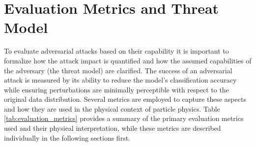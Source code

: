 
\section{Evaluation Metrics and Threat Model}

To evaluate adversarial attacks based on their capability it is important to  formalize how the attack impact is quantified and how the assumed capabilities of the adversary (the threat model) are clarified. The success of an adversarial attack is measured by its ability to reduce the model’s classification accuracy while ensuring perturbations are minimally perceptible with respect to the original data distribution. Several metrics are employed to capture these aspects and how they are used in the physical context of particle physics. Table \ref{tab:evaluation_metrics} provides a summary of the primary evaluation metrics used and their physical interpretation, while these metrics are described individually in the following sections first. 

